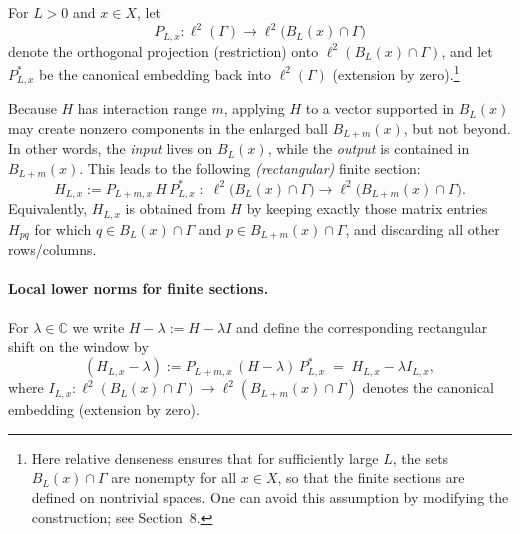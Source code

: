 \documentclass[11pt]{article}
\theoremstyle{definition}
\newcommand{\C}{\mathbb{C}}
\begin{document}
For \(L>0\) and \(x\in X\), let
\[
  P_{L,x}:\ell^2(\Gamma)\to \ell^2\bigl(B_L(x)\cap\Gamma\bigr)
\]
denote the orthogonal projection (restriction) onto \(\ell^2(B_L(x)\cap\Gamma)\),
and let \(P_{L,x}^*\) be the canonical embedding back into \(\ell^2(\Gamma)\)
(extension by zero).\footnote{Here relative denseness ensures that for sufficiently large \(L\), the sets \(B_L(x)\cap\Gamma\) are nonempty for all \(x\in X\), so that the finite sections are defined on nontrivial spaces. One can avoid this assumption by modifying the construction; see Section~8.}

Because \(H\) has interaction range \(m\), applying \(H\) to a vector supported in
\(B_L(x)\) may create nonzero components in the enlarged ball \(B_{L+m}(x)\), but
not beyond. In other words, the \emph{input} lives on \(B_L(x)\), while the
\emph{output} is contained in \(B_{L+m}(x)\). This leads to the following
\emph{(rectangular)} finite section:
\[
  H_{L,x}
  := P_{L+m,x}\,H\,P_{L,x}^*
  \;:\;
  \ell^2\bigl(B_L(x)\cap\Gamma\bigr)
  \longrightarrow
  \ell^2\bigl(B_{L+m}(x)\cap\Gamma\bigr).
\]
Equivalently, \(H_{L,x}\) is obtained from \(H\) by keeping exactly those matrix
entries \(H_{pq}\) for which \(q\in B_L(x)\cap\Gamma\) and
\(p\in B_{L+m}(x)\cap\Gamma\), and discarding all other rows/columns.


\paragraph{Local lower norms for finite sections.}
\label{par: local lower norms}
For $\lambda\in\C$ we write $H-\lambda := H-\lambda I$ and define the corresponding
rectangular shift on the window by
\[
  (H_{L,x}-\lambda)
  := P_{L+m,x}\,(H-\lambda)\,P_{L,x}^*
  \;=\; H_{L,x}-\lambda I_{L,x},
\]
where $I_{L,x}:\ell^2(B_L(x)\cap\Gamma)\to \ell^2(B_{L+m}(x)\cap\Gamma)$ denotes the
canonical embedding (extension by zero).
\end{document}
